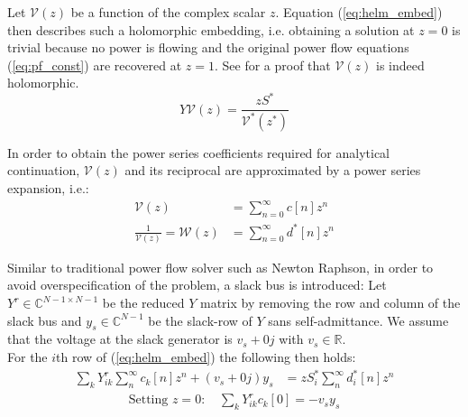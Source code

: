 Let $\mathcal{V}(z)$ be a function of the complex scalar $z$. Equation (\ref{eq:helm_embed}) then describes such a holomorphic embedding, i.e. obtaining a solution at $z = 0$ is trivial because no power is flowing and the original power flow equations (\ref{eq:pf_const}) are recovered at $z = 1$. See \cite{wallace2016alternative} for a proof that $\mathcal{V}(z)$ is indeed holomorphic.
\begin{equation}
Y\mathcal{V}(z) = \frac{zS^*}{\mathcal{V}^*(z^*)} \label{eq:helm_embed}
\end{equation}

In order to obtain the power series coefficients required for analytical continuation, $\mathcal{V}(z)$ and its reciprocal are approximated by a power series expansion, i.e.:
\begin{align}
\mathcal{V}(z) &= \sum_{n=0}^\infty c[n]z^n \label{eq:power_series}\\
\frac{1}{\mathcal{V}(z)} = \mathcal{W}(z) &= \sum_{n=0}^\infty d^*[n]z^n
\end{align}

Similar to traditional power flow solver such as Newton Raphson, in order to avoid overspecification of the problem, a slack bus is introduced: Let $Y^r \in \mathbb{C}^{N-1 \times N-1}$ be the reduced $Y$ matrix by removing the row and column of the slack bus and $y_s \in \mathbb{C}^{N-1}$ be the slack-row of $Y$ sans self-admittance. We assume that the voltage at the slack generator is $v_s + 0j$ with $v_s \in \mathbb{R}$.\\

For the $i$th row of (\ref{eq:helm_embed}) the following then holds:
\begin{align}
\sum_k Y^r_{ik} \sum_n^{\infty} c_k[n]z^n + (v_s+0j)y_s &= zS_i^*\sum_n^{\infty} d^*_i[n]z^n
\end{align}
\begin{align}
\text{Setting $z=0$:\ }&\sum_k Y^r_{ik} c_k[0]  = - v_s y_s \label{eq:z0}
\end{align}

